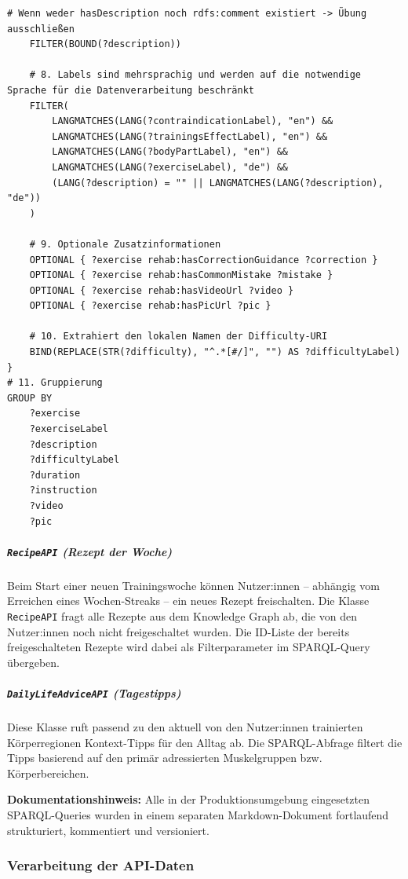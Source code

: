 \begin{lstlisting}[caption={SPARQL-Query der Klasse \texttt{ExerciseAPI} für Planerstellung und Planempfehlung}, label={lst:sparql_exercise}]
    # Wenn weder hasDescription noch rdfs:comment existiert -> Übung ausschließen
    FILTER(BOUND(?description))

    # 8. Labels sind mehrsprachig und werden auf die notwendige Sprache für die Datenverarbeitung beschränkt
    FILTER(
        LANGMATCHES(LANG(?contraindicationLabel), "en") &&
        LANGMATCHES(LANG(?trainingsEffectLabel), "en") &&
        LANGMATCHES(LANG(?bodyPartLabel), "en") &&
        LANGMATCHES(LANG(?exerciseLabel), "de") &&
        (LANG(?description) = "" || LANGMATCHES(LANG(?description), "de"))
    )

    # 9. Optionale Zusatzinformationen
    OPTIONAL { ?exercise rehab:hasCorrectionGuidance ?correction }
    OPTIONAL { ?exercise rehab:hasCommonMistake ?mistake }
    OPTIONAL { ?exercise rehab:hasVideoUrl ?video }
    OPTIONAL { ?exercise rehab:hasPicUrl ?pic }

    # 10. Extrahiert den lokalen Namen der Difficulty-URI
    BIND(REPLACE(STR(?difficulty), "^.*[#/]", "") AS ?difficultyLabel)
}
# 11. Gruppierung
GROUP BY
    ?exercise
    ?exerciseLabel
    ?description
    ?difficultyLabel
    ?duration
    ?instruction
    ?video
    ?pic
\end{lstlisting}

\subparagraph{\texttt{RecipeAPI} (\textit{Rezept der Woche})}
Beim Start einer neuen Trainingswoche können Nutzer:innen -- abhängig vom Erreichen eines Wochen-Streaks -- ein neues Rezept freischalten. Die Klasse \texttt{RecipeAPI} fragt alle Rezepte aus dem Knowledge Graph ab, die von den Nutzer:innen noch nicht freigeschaltet wurden. Die ID-Liste der bereits freigeschalteten Rezepte wird dabei als Filterparameter im SPARQL-Query übergeben.

\subparagraph{\texttt{DailyLifeAdviceAPI} (\textit{Tagestipps})}
Diese Klasse ruft passend zu den aktuell von den Nutzer:innen trainierten Körperregionen Kontext-Tipps für den Alltag ab. Die SPARQL-Abfrage filtert die Tipps basierend auf den primär adressierten Muskelgruppen bzw. Körperbereichen.

\medskip
\noindent\textbf{Dokumentationshinweis:} Alle in der Produktionsumgebung eingesetzten SPARQL-Queries wurden in einem separaten Markdown-Dokument fortlaufend strukturiert, kommentiert und versioniert.


\subsubsection{Verarbeitung der API-Daten}

